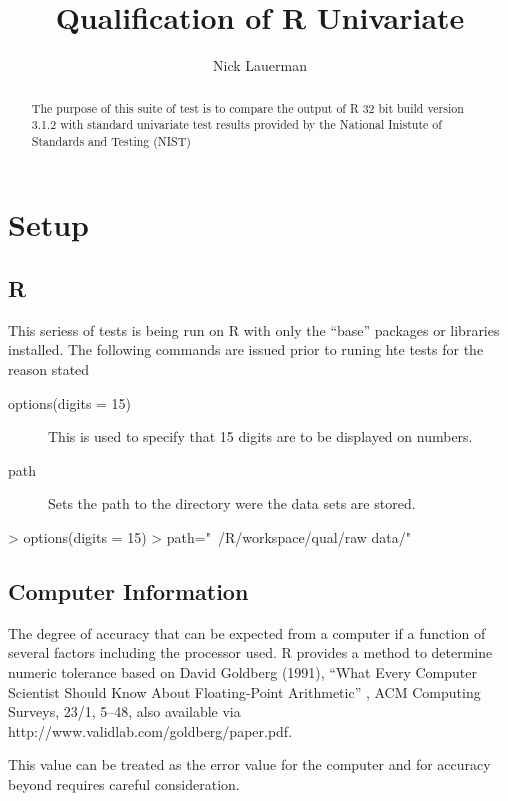 \documentclass[10pt]{article}
\title{Qualification of R Univariate}
\author{Nick Lauerman}
\begin{document}

\maketitle

\begin{abstract}
The purpose of this suite of test is to compare the output of R 32 bit build
version 3.1.2 with standard univariate test results provided by the National
Inistute of Standards and Testing (NIST)
\end{abstract}

\tableofcontents

\section{Setup}
\subsection{R}
This seriess of tests is being run on R with only the ``base'' packages or libraries
installed. The following commands are issued prior to runing hte tests for the 
reason stated

\begin{description}
   \item[options(digits = 15)] This is used to specify that 15 digits are to be displayed
   on numbers.
   \item[path] Sets the path to the directory were the data sets are stored.
\end{description}
\begin{Schunk}
\begin{Sinput}
> options(digits = 15)
> path="~/R/workspace/qual/raw data/"
\end{Sinput}
\end{Schunk}
\subsection{Computer Information}
The degree of accuracy  that can be expected from a computer if a function of several
factors including the processor used. R provides a method to determine numeric tolerance based on 
David Goldberg (1991), “What Every Computer Scientist Should Know About Floating-Point Arithmetic”
, ACM Computing Surveys, 23/1, 5–48, also available via http://www.validlab.com/goldberg/paper.pdf.

This value can be treated as the error value for the computer and for accuracy beyond requires careful
consideration.
\end{document}
